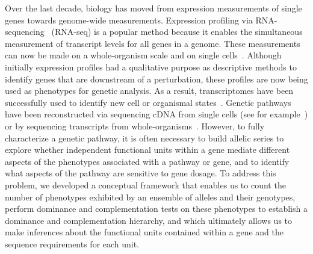 \documentclass[10pt, twocolumn]{article}
\begin{document}
Over the last decade, biology has moved from expression measurements of single
genes towards genome-wide measurements. Expression profiling via
RNA-sequencing~\cite{Mortazavi2008} (RNA-seq) is a popular method because it
enables the simultaneous measurement of transcript levels for all genes in a
genome. These measurements can now be made on a whole-organism scale and on
single cells~\cite{Tang2009}. Although initially expression profiles had a
qualitative purpose as descriptive methods to identify genes that are downstream
of a perturbation, these profiles are now being used as phenotypes for genetic
analysis. As a result, transcriptomes have been successfully used to identify
new cell or organismal states~\cite{Angeles-Albores2017,Villani2017}. Genetic
pathways have been reconstructed via sequencing cDNA from single cells (see for
example~\cite{Dixit2016}) or by sequencing transcripts from
whole-organisms~\cite{AngelesAlboresHIF}. However, to fully characterize a
genetic pathway, it is often necessary to build allelic series to explore
whether independent functional units within a gene mediate different aspects of
the phenotypes associated with a pathway or gene, and to identify what aspects of
the pathway are sensitive to gene dosage. To address this problem, we developed
a conceptual framework that enables us to count the number of phenotypes exhibited
by an ensemble of alleles and their genotypes, perform dominance and
complementation tests on these phenotypes to establish a dominance and
complementation hierarchy, and which ultimately allows us to make inferences
about the functional units contained within a gene and the sequence requirements
for each unit.
\end{document}
